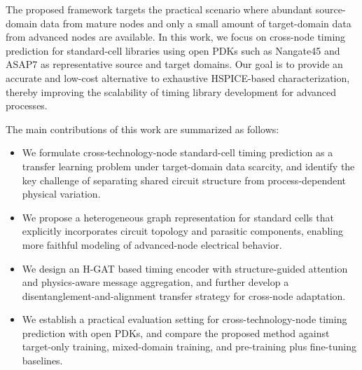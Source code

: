 The proposed framework targets the practical scenario where abundant source-domain data from mature nodes and only a small amount of target-domain data from advanced nodes are available. In this work, we focus on cross-node timing prediction for standard-cell libraries using open PDKs such as Nangate45 and ASAP7 as representative source and target domains. Our goal is to provide an accurate and low-cost alternative to exhaustive HSPICE-based characterization, thereby improving the scalability of timing library development for advanced processes.

The main contributions of this work are summarized as follows:
\begin{itemize}

    \item We formulate cross-technology-node standard-cell timing prediction as a transfer learning problem under target-domain data scarcity, and identify the key challenge of separating shared circuit structure from process-dependent physical variation.
    \item We propose a heterogeneous graph representation for standard cells that explicitly incorporates circuit topology and parasitic components, enabling more faithful modeling of advanced-node electrical behavior.
    \item We design an H-GAT based timing encoder with structure-guided attention and physics-aware message aggregation, and further develop a disentanglement-and-alignment transfer strategy for cross-node adaptation.
    \item We establish a practical evaluation setting for cross-technology-node timing prediction with open PDKs, and compare the proposed method against target-only training, mixed-domain training, and pre-training plus fine-tuning baselines.
\end{itemize}
